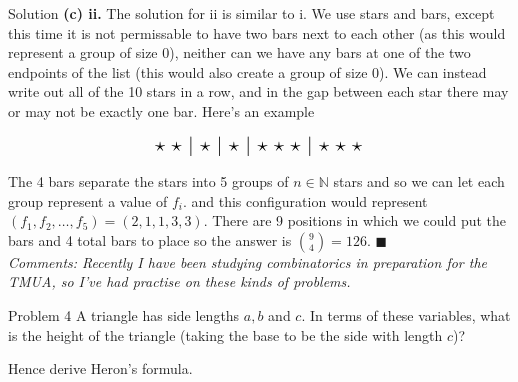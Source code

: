 \documentclass{article}
\begin{document}
\begin{solution}{Solution}
\textbf{(c) ii.} The solution for ii is similar to i. We use stars and
bars, except this time it is not permissable to have two bars next to
each other (as this would represent a group of size 0), neither can we have
any bars at one of the two endpoints of the list (this would also create
a group of size 0). We can instead write out all of the 10 stars in a row,
and in the gap between each star there may or may not be exactly one bar.
Here's an example

$$
\text{
\Large
$\star$
$\star$
$\mid$
$\star$
$\mid$
$\star$
$\mid$
$\star$
$\star$
$\star$
$\mid$
$\star$
$\star$
$\star$
}
$$

The 4 bars separate the stars into 5 groups of
$n \in \mathbb{N}$ stars and so we can let each group represent a value of
$f_i$.
and this configuration would represent $(f_1,f_2,\ldots, f_5) =
(2,1,1,3,3)$. There are 9 positions in which we could put the bars and 4
total bars to place so the answer is $\binom{9}{4} = 126$. $\blacksquare$
\\

\textit{Comments: Recently I have been studying combinatorics in
preparation for the TMUA, so I've had practise on these kinds of problems.}
\end{solution}
\newpage


\begin{problem}{Problem 4}
A triangle has side lengths $a, b$ and $c$.
In terms of these variables, what is the height of the triangle
(taking the base to be the side with length $c$)? \vspace{0.2cm}

Hence derive Heron's formula.
\end{problem}
\end{document}
